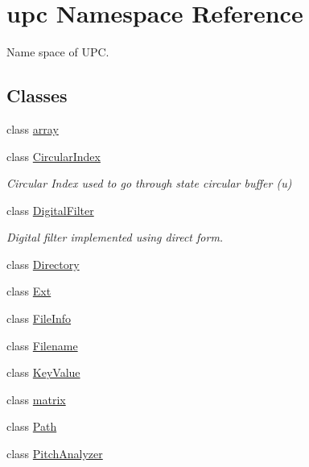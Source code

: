 \hypertarget{namespaceupc}{}\section{upc Namespace Reference}
\label{namespaceupc}


Name space of U\+PC.  


\subsection*{Classes}
\begin{DoxyCompactItemize}
\item 
class \hyperlink{classupc_1_1array}{array}
\item 
class \hyperlink{classupc_1_1CircularIndex}{Circular\+Index}
\begin{DoxyCompactList}\small\item\em Circular Index used to go through state circular buffer (u) \end{DoxyCompactList}\item 
class \hyperlink{classupc_1_1DigitalFilter}{Digital\+Filter}
\begin{DoxyCompactList}\small\item\em Digital filter implemented using direct form. \end{DoxyCompactList}\item 
class \hyperlink{classupc_1_1Directory}{Directory}
\item 
class \hyperlink{classupc_1_1Ext}{Ext}
\item 
class \hyperlink{classupc_1_1FileInfo}{File\+Info}
\item 
class \hyperlink{classupc_1_1Filename}{Filename}
\item 
class \hyperlink{classupc_1_1KeyValue}{Key\+Value}
\item 
class \hyperlink{classupc_1_1matrix}{matrix}
\item 
class \hyperlink{classupc_1_1Path}{Path}
\item 
class \hyperlink{classupc_1_1PitchAnalyzer}{Pitch\+Analyzer}
\end{DoxyCompactItemize}
